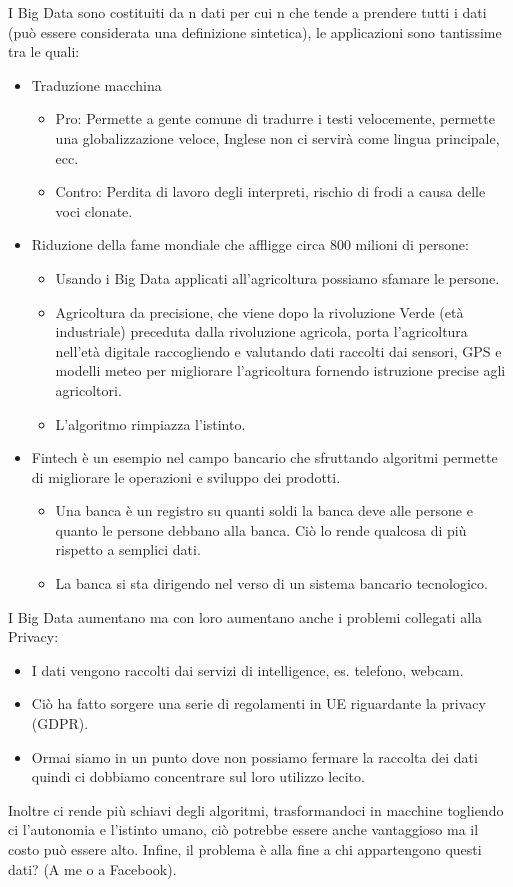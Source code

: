 \documentclass[a4page, 11pt]{article}
\begin{document}
I Big Data sono costituiti da n dati per cui n che tende a prendere tutti i dati (può essere considerata una definizione sintetica), le applicazioni sono tantissime tra le quali:
\begin{itemize}
	\item Traduzione macchina
	\begin{itemize}
		\item Pro: Permette a gente comune di tradurre i testi velocemente, permette una globalizzazione veloce, Inglese non ci servirà come lingua principale, ecc.
		\item Contro: Perdita di lavoro degli interpreti, rischio di frodi a causa delle voci clonate.
	\end{itemize}
	\item Riduzione della fame mondiale che affligge circa 800 milioni di persone:
	\begin{itemize}
		\item Usando i Big Data applicati all’agricoltura possiamo sfamare le persone.
		\item Agricoltura da precisione, che viene dopo la rivoluzione Verde (età industriale) preceduta dalla rivoluzione agricola, porta l’agricoltura nell’età digitale raccogliendo e valutando dati raccolti dai sensori, GPS e modelli meteo per migliorare l’agricoltura fornendo istruzione precise agli agricoltori. 
		\item L’algoritmo rimpiazza l’istinto.
	\end{itemize}
	\item Fintech è un esempio nel campo bancario che sfruttando algoritmi permette di migliorare le operazioni e sviluppo dei prodotti.
	\begin{itemize}
		\item Una banca è un registro su quanti soldi la banca deve alle persone e quanto le persone debbano alla banca. Ciò lo rende qualcosa di più rispetto a semplici dati.
		\item La banca si sta dirigendo nel verso di un sistema bancario tecnologico.
	\end{itemize}
\end{itemize}
I Big Data aumentano ma con loro aumentano anche i problemi collegati alla Privacy:
\begin{itemize}
	\item I dati vengono raccolti dai servizi di intelligence, es. telefono, webcam.
	\item Ciò ha fatto sorgere una serie di regolamenti in UE riguardante la privacy (GDPR).
	\item Ormai siamo in un punto dove non possiamo fermare la raccolta dei dati quindi ci dobbiamo concentrare sul loro utilizzo lecito.
\end{itemize}
Inoltre ci rende più schiavi degli algoritmi, trasformandoci in macchine togliendo ci l’autonomia e l’istinto umano, ciò potrebbe essere anche vantaggioso ma il costo può essere alto. Infine, il problema è alla fine a chi appartengono questi dati? (A me o a Facebook).
\end{document}
